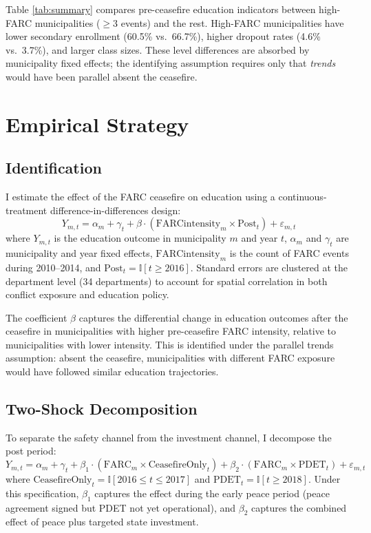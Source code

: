 \documentclass[12pt]{article}
\newcommand{\ind}{\mathbb{I}}
\begin{document}


Table \ref{tab:summary} compares pre-ceasefire education indicators between high-FARC municipalities ($\geq$3 events) and the rest. High-FARC municipalities have lower secondary enrollment (60.5\% vs.\ 66.7\%), higher dropout rates (4.6\% vs.\ 3.7\%), and larger class sizes. These level differences are absorbed by municipality fixed effects; the identifying assumption requires only that \emph{trends} would have been parallel absent the ceasefire.


\section{Empirical Strategy}

\subsection{Identification}

I estimate the effect of the FARC ceasefire on education using a continuous-treatment difference-in-differences design:
\begin{equation}
Y_{m,t} = \alpha_m + \gamma_t + \beta \cdot (\text{FARCintensity}_m \times \text{Post}_t) + \varepsilon_{m,t}
\label{eq:main}
\end{equation}
where $Y_{m,t}$ is the education outcome in municipality $m$ and year $t$, $\alpha_m$ and $\gamma_t$ are municipality and year fixed effects, $\text{FARCintensity}_m$ is the count of FARC events during 2010--2014, and $\text{Post}_t = \ind[t \geq 2016]$. Standard errors are clustered at the department level (34 departments) to account for spatial correlation in both conflict exposure and education policy.

The coefficient $\beta$ captures the differential change in education outcomes after the ceasefire in municipalities with higher pre-ceasefire FARC intensity, relative to municipalities with lower intensity. This is identified under the parallel trends assumption: absent the ceasefire, municipalities with different FARC exposure would have followed similar education trajectories.

\subsection{Two-Shock Decomposition}

To separate the safety channel from the investment channel, I decompose the post period:
\begin{equation}
Y_{m,t} = \alpha_m + \gamma_t + \beta_1 \cdot (\text{FARC}_m \times \text{CeasefireOnly}_t) + \beta_2 \cdot (\text{FARC}_m \times \text{PDET}_t) + \varepsilon_{m,t}
\label{eq:twoshock}
\end{equation}
where $\text{CeasefireOnly}_t = \ind[2016 \leq t \leq 2017]$ and $\text{PDET}_t = \ind[t \geq 2018]$. Under this specification, $\beta_1$ captures the effect during the early peace period (peace agreement signed but PDET not yet operational), and $\beta_2$ captures the combined effect of peace plus targeted state investment.
\end{document}
